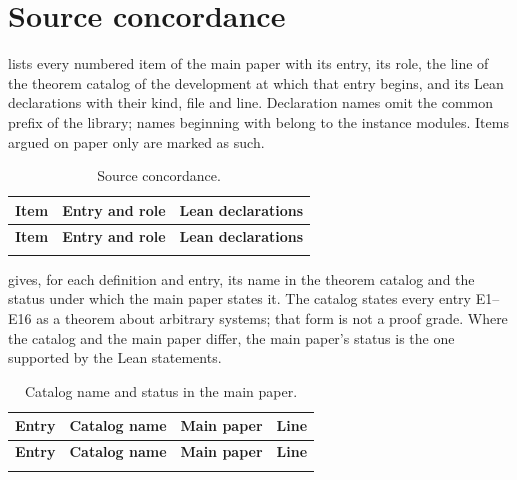 \section{Source concordance}
\label{supp:concordance}

 lists every numbered item of the main paper with its entry, its role, the
line of the theorem catalog of the development at which that entry begins, and its Lean declarations
with their kind, file and line. Declaration names omit the common prefix of the library; names
beginning with  belong to the instance modules. Items argued on paper only are
marked as such.

{\scriptsize
\begin{longtable}{@{}l>{\raggedright\arraybackslash}p{2.8cm}>{\raggedright\arraybackslash}p{10.2cm}@{}}
\caption{Source concordance.}\label{tab:concordance}\\
\toprule
\textbf{Item} & \textbf{Entry and role} & \textbf{Lean declarations} \\
\midrule
\endfirsthead
\toprule
\textbf{Item} & \textbf{Entry and role} & \textbf{Lean declarations} \\
\midrule
\endhead
\bottomrule
\endfoot

\end{longtable}
}

 gives, for each definition and entry, its name in the theorem catalog and the
status under which the main paper states it. The catalog states every entry E1--E16 as a theorem
about arbitrary systems; that form is not a proof grade. Where the catalog and the main paper differ, the main paper's status is the one
supported by the Lean statements.

{\small
\begin{longtable}{@{}l>{\raggedright\arraybackslash}p{5.6cm}>{\raggedright\arraybackslash}p{5.6cm}r@{}}
\caption{Catalog name and status in the main paper.}\label{tab:catalog-index}\\
\toprule
\textbf{Entry} & \textbf{Catalog name} & \textbf{Main paper} & \textbf{Line} \\
\midrule
\endfirsthead
\toprule
\textbf{Entry} & \textbf{Catalog name} & \textbf{Main paper} & \textbf{Line} \\
\midrule
\endhead
\bottomrule
\endfoot

\end{longtable}
}
